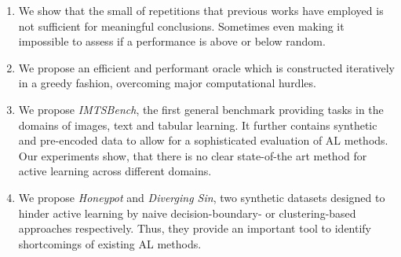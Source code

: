 \documentclass[]{article}
\begin{document}
\begin{enumerate}
\item We show that the small of repetitions that previous works have employed is not
sufficient for meaningful conclusions. Sometimes even making it impossible to assess if a performance is above or below random.
\item We propose an efficient and performant oracle which is constructed iteratively in a greedy fashion,
overcoming major computational hurdles.
\item We propose \emph{IMTSBench}, the first general benchmark providing tasks
in the domains of images, text and tabular learning. It further contains
synthetic and pre-encoded data to allow for a sophisticated evaluation of AL
methods. Our experiments show, that there is no clear state-of-the art method
for active learning across different domains.
\item We propose \emph{Honeypot} and \emph{Diverging Sin}, two synthetic datasets
designed to hinder active learning by naive decision-boundary- or
clustering-based approaches respectively. Thus, they provide an important tool to identify 
shortcomings of existing AL methods.
\end{enumerate}

\end{document}
